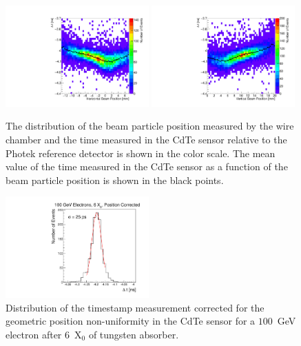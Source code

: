 \begin{figure}[htbp] 
\centering
\includegraphics[width=0.49\textwidth]{figures/DeltaTVsHorizontalPosition.pdf} 
\includegraphics[width=0.49\textwidth]{figures/DeltaTVsVerticalPosition.pdf} 
\caption{ The distribution of the beam particle position measured by the wire chamber
and the time measured in the CdTe sensor relative to the Photek reference detector
is shown in the color scale. The mean value of the time measured in the CdTe sensor as a function
of the beam particle position is shown in the black points.} 
\label{fig:DeltaTVsBeamXY} 
\end{figure} 

\begin{figure}[htbp] 
\centering
\includegraphics[width=0.49\textwidth]{figures/CdTeTimingResolution_100GeV_PositionCorrected.pdf} 
\caption{Distribution of the timestamp measurement corrected for the geometric position
non-uniformity in the CdTe sensor for a $100$~GeV electron after $6$~$\mathrm{X}_{0}$ of tungsten absorber. } 
\label{fig:DeltaTCorr} 
\end{figure} 



